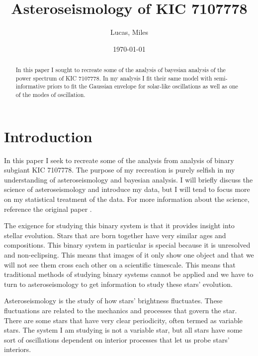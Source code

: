 \documentclass[
    aip,
    jmp,
    reprint,
    nofootinbib,
    floatfix
    ]{revtex4-1}
\begin{document}
	
    \title[Asteroseismology of KIC 7107778]{Asteroseismology of KIC 7107778}

    \author{Lucas, Miles}

    \date{\today}

    \begin{abstract}
        In this paper I sought to recreate some of the analysis of \citet{li} bayesian analysis of the power spectrum of KIC 7107778. In my analysis I fit their same model with semi-informative priors to fit the Gaussian envelope for solar-like oscillations as well as one of the modes of oscillation. 
    \end{abstract}
    
    \maketitle

    \section{Introduction}
        In this paper I seek to recreate some of the analysis from \citet{li} analysis of binary subgiant KIC 7107778. The purpose of my recreation is purely selfish in my understanding of asteroseismology and bayesian analysis. I will briefly discuss the science of asteroseismology and introduce my data, but I will tend to focus more on my statistical treatment of the data. For more information about the science, reference the original paper \citep{li}.

        The exigence for studying this binary system is that it provides insight into stellar evolution. Stars that are born together have very similar ages and compositions. This binary system in particular is special because it is unresolved and non-eclipsing. This means that images of it only show one object and that we will not see them cross each other on a scientific timescale. This means that traditional methods of studying binary systems cannot be applied and we have to turn to asteroseismology to get information to study these stars' evolution.

        Asteroseismology is the study of how stars' brightness fluctuates. These fluctuations are related to the mechanics and processes that govern the star. There are some stars that have very clear periodicity, often termed as variable stars. The system I am studying is not a variable star, but all stars have some sort of oscillations dependent on interior processes that let us probe stars' interiors. 
\end{document}
